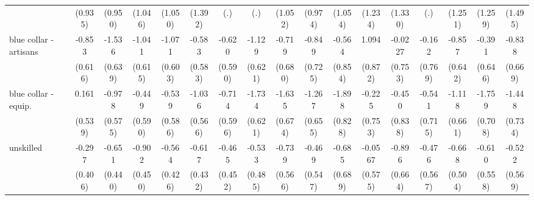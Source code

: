 {\begin{tabular}{l*{16}{c}}
                    &     (0.935)         &     (0.950)         &     (1.046)         &     (1.050)         &     (1.392)         &         (.)         &         (.)         &     (1.052)         &     (0.974)         &     (1.054)         &     (1.234)         &     (1.330)         &         (.)         &     (1.251)         &     (1.259)         &     (1.495)         \\
[1em]
blue collar - artisans&      -0.853         &      -1.536\sym{*}  &      -1.041         &      -1.071         &      -0.583         &      -0.620         &      -1.129         &      -0.719         &      -0.849         &      -0.564         &       1.094         &     -0.0227         &      -0.162         &      -0.857         &      -0.391         &      -0.838         \\
                    &     (0.616)         &     (0.639)         &     (0.615)         &     (0.603)         &     (0.583)         &     (0.590)         &     (0.621)         &     (0.680)         &     (0.725)         &     (0.854)         &     (0.872)         &     (0.753)         &     (0.769)         &     (0.642)         &     (0.646)         &     (0.669)         \\
[1em]
blue collar - equip.&       0.161         &      -0.978         &      -0.449         &      -0.539         &      -1.036         &      -0.714         &      -1.734\sym{**} &      -1.635\sym{*}  &      -1.267         &      -1.898\sym{*}  &      -0.225         &      -0.450         &      -0.541         &      -1.118         &      -1.759\sym{*}  &      -1.448\sym{*}  \\
                    &     (0.539)         &     (0.575)         &     (0.590)         &     (0.586)         &     (0.566)         &     (0.596)         &     (0.621)         &     (0.674)         &     (0.655)         &     (0.828)         &     (0.753)         &     (0.838)         &     (0.715)         &     (0.661)         &     (0.708)         &     (0.734)         \\
[1em]
unskilled           &      -0.297         &      -0.651         &      -0.902\sym{*}  &      -0.564         &      -0.617         &      -0.465         &      -0.533         &      -0.739         &      -0.469         &      -0.685         &     -0.0567         &      -0.896         &      -0.476         &      -0.668         &      -0.610         &      -0.522         \\
                    &     (0.406)         &     (0.440)         &     (0.450)         &     (0.426)         &     (0.432)         &     (0.452)         &     (0.485)         &     (0.566)         &     (0.547)         &     (0.689)         &     (0.575)         &     (0.664)         &     (0.567)         &     (0.504)         &     (0.558)         &     (0.569)         \\

\end{tabular}}
